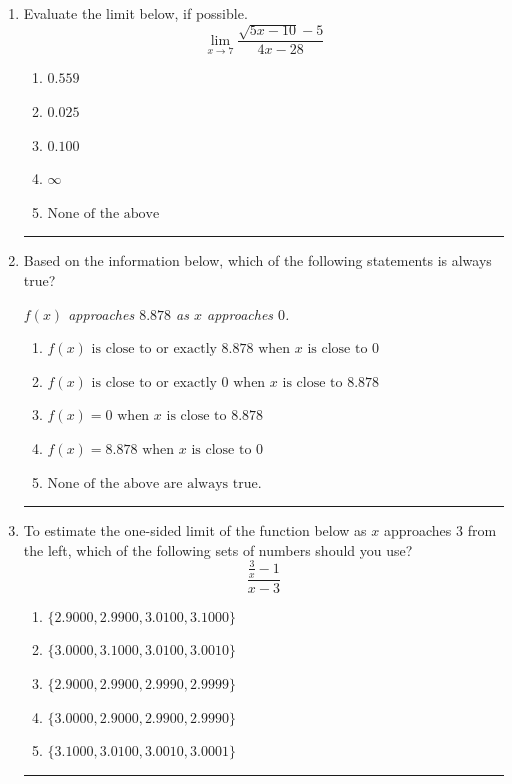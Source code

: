 \documentclass[14pt]{extbook}
\newcommand{\litem}[1]{\item#1\hspace*{-1cm}\rule{\textwidth}{0.4pt}}
\begin{document}
\begin{enumerate}
{\begin{enumerate}[label=\Alph*.]
\end{enumerate} }
\litem{
Evaluate the limit below, if possible.\[ \lim_{x \rightarrow 7} \frac{\sqrt{5x - 10} - 5}{4x - 28} \]\begin{enumerate}[label=\Alph*.]
\item \( 0.559 \)
\item \( 0.025 \)
\item \( 0.100 \)
\item \( \infty \)
\item \( \text{None of the above} \)

\end{enumerate} }
\litem{
Based on the information below, which of the following statements is always true?
\begin{center}
    \textit{ $f(x)$ approaches $8.878$ as $x$ approaches $0$. }
\end{center}
\begin{enumerate}[label=\Alph*.]
\item \( f(x) \text{ is close to or exactly } 8.878 \text{ when } x \text{ is close to } 0 \)
\item \( f(x) \text{ is close to or exactly } 0 \text{ when } x \text{ is close to } 8.878 \)
\item \( f(x) = 0 \text{ when } x \text{ is close to } 8.878 \)
\item \( f(x) = 8.878 \text{ when } x \text{ is close to } 0 \)
\item \( \text{None of the above are always true.} \)

\end{enumerate} }
\litem{
To estimate the one-sided limit of the function below as $x$ approaches 3 from the left, which of the following sets of numbers should you use?\[ \frac{\frac{3}{x} - 1}{x - 3} \]\begin{enumerate}[label=\Alph*.]
\item \( \{ 2.9000, 2.9900, 3.0100, 3.1000 \} \)
\item \( \{ 3.0000, 3.1000, 3.0100, 3.0010 \} \)
\item \( \{ 2.9000, 2.9900, 2.9990, 2.9999 \} \)
\item \( \{ 3.0000, 2.9000, 2.9900, 2.9990 \} \)
\item \( \{ 3.1000, 3.0100, 3.0010, 3.0001 \} \)


\end{enumerate}}
\end{enumerate}
\end{document}
